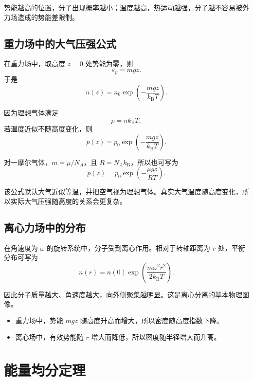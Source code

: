 \begin{KeyBox}[玻尔兹曼分布的核心]
势能越高的位置，分子出现概率越小；温度越高，热运动越强，分子越不容易被外力场造成的势能差限制。
\end{KeyBox}

\subsection{重力场中的大气压强公式}

在重力场中，取高度 \(z=0\) 处势能为零，则
\[
  \varepsilon_p=mgz.
\]
于是
\[
  \boxed{
  n(z)=n_0\exp\left(-\frac{mgz}{k_{\mathrm B}T}\right)
  }.
\]

因为理想气体满足
\[
  p=nk_{\mathrm B}T,
\]
若温度近似不随高度变化，则
\[
  \boxed{
  p(z)=p_0\exp\left(-\frac{mgz}{k_{\mathrm B}T}\right)
  }.
\]

对一摩尔气体，\(m=\mu/N_A\)，且 \(R=N_Ak_{\mathrm B}\)，所以也可写为
\[
  \boxed{
  p(z)=p_0\exp\left(-\frac{\mu gz}{RT}\right)
  }.
\]

\begin{WarnBox}[大气压强公式的条件]
该公式默认大气近似等温，并把空气视为理想气体。真实大气温度随高度变化，所以实际大气压强随高度的关系会更复杂。
\end{WarnBox}

\subsection{离心力场中的分布}

在角速度为 \(\omega\) 的旋转系统中，分子受到离心作用。相对于转轴距离为 \(r\) 处，平衡分布可写为
\[
  \boxed{
  n(r)
  =
  n(0)
  \exp\left(
  \frac{m\omega^2r^2}{2k_{\mathrm B}T}
  \right)
  }.
\]

因此分子质量越大、角速度越大，向外侧聚集越明显。这是离心分离的基本物理图像。

\begin{KeyBox}[重力场与离心场的对比]
\begin{itemize}
  \item 重力场中，势能 \(mgz\) 随高度升高而增大，所以密度随高度指数下降。
  \item 离心场中，有效势能随 \(r\) 增大而降低，所以密度随半径增大而升高。
\end{itemize}
\end{KeyBox}

\section{能量均分定理}

